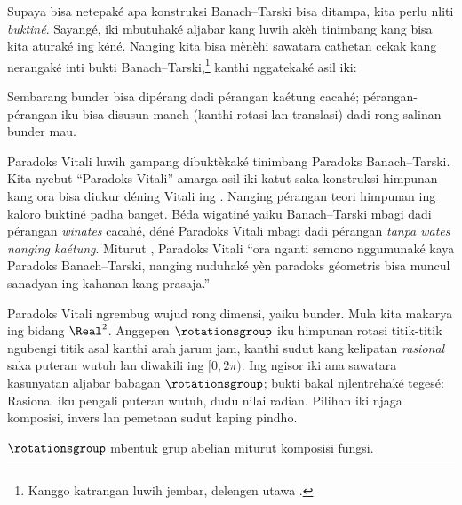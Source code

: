 \documentclass[../../../include/open-logic-section]{subfiles}
\begin{document}

Supaya bisa netepaké apa konstruksi Banach--Tarski bisa ditampa,
kita perlu nliti \emph{buktiné}. Sayangé, iki mbutuhaké aljabar
kang luwih akèh tinimbang kang bisa kita aturaké ing kéné.
Nanging kita bisa mènèhi sawatara cathetan cekak kang nerangaké
inti bukti Banach--Tarski,\footnote{Kanggo katrangan luwih jembar,
delengen \cite{Weston2003} utawa \cite{Wagon2016}.} kanthi
nggatekaké asil iki:

\begin{thm}
Sembarang bunder bisa dipérang dadi pérangan kaétung cacahé;
pérangan-pérangan iku bisa disusun maneh (kanthi rotasi lan translasi)
dadi rong salinan bunder mau.
\end{thm}

Paradoks Vitali luwih gampang dibuktèkaké tinimbang Paradoks
Banach--Tarski. Kita nyebut ``Paradoks Vitali'' amarga asil iki
katut saka konstruksi himpunan kang ora bisa diukur déning Vitali
ing \citeyear{Vitali1905}. Nanging pérangan teori himpunan ing
kaloro buktiné padha banget. Béda wigatiné yaiku Banach--Tarski
mbagi dadi pérangan \emph{winates} cacahé, déné Paradoks Vitali
mbagi dadi pérangan \emph{tanpa wates nanging kaétung}. Miturut
\citet{Weston2003}, Paradoks Vitali ``ora nganti semono
nggumunaké kaya Paradoks Banach--Tarski, nanging nuduhaké yèn
paradoks géometris bisa muncul sanadyan ing kahanan kang prasaja.''

Paradoks Vitali ngrembug wujud rong dimensi, yaiku bunder.
Mula kita makarya ing bidang $\Real^2$. Anggepen $\rotationsgroup$
iku himpunan rotasi titik-titik ngubengi titik asal kanthi arah
jarum jam, kanthi sudut kang kelipatan \emph{rasional} saka puteran wutuh
lan diwakili ing $[0,2\pi)$. Ing ngisor iki ana sawatara kasunyatan
aljabar babagan $\rotationsgroup$; bukti bakal njlentrehaké tegesé:
Rasional iku pengali puteran wutuh, dudu nilai radian. Pilihan iki njaga komposisi, invers lan pemetaan sudut kaping pindho.

\begin{lem}
$\rotationsgroup$ mbentuk {grup} abelian miturut komposisi fungsi.
\end{lem}
\end{document}
